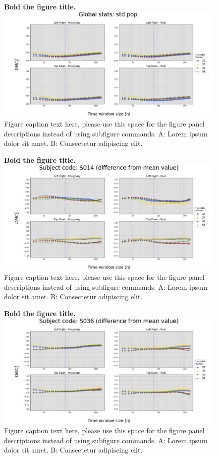 \documentclass[10pt,letterpaper]{article}
\begin{document}
\begin{figure}[!h]
    \caption{{\bf Bold the figure title.}
    \includegraphics[width=.9\textwidth]{../output/figs/global/std pop.jpg}
    Figure caption text here, please use this space for the figure panel descriptions instead of using subfigure commands. A: Lorem ipsum dolor sit amet. B: Consectetur adipiscing elit.}
    \label{fig:glob_std_pop}
\end{figure}


\begin{figure}[!h]
  \caption{{\bf Bold the figure title.}
  \includegraphics[width=.9\textwidth]{../output/figs/diff/S014.jpg}
  Figure caption text here, please use this space for the figure panel descriptions instead of using subfigure commands. A: Lorem ipsum dolor sit amet. B: Consectetur adipiscing elit.}
  \label{fig:diff_s014}
\end{figure}


\begin{figure}[!h]
  \caption{{\bf Bold the figure title.}
  \includegraphics[width=.9\textwidth]{../output/figs/diff/S036.jpg}
  Figure caption text here, please use this space for the figure panel descriptions instead of using subfigure commands. A: Lorem ipsum dolor sit amet. B: Consectetur adipiscing elit.}
  \label{fig:diff_s036}
\end{figure}
\end{document}
